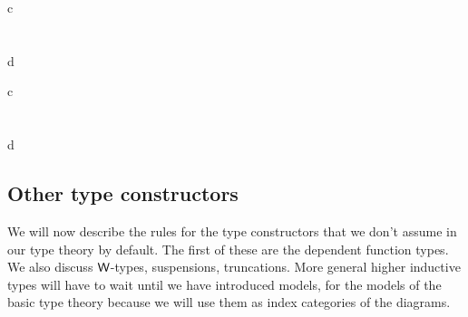 \begin{infarray}{c}
\inference{\jctx{\Gamma}}{\jtype{\ctxext{\Gamma}{\ctxwk{\Gamma}{\Gamma}}}{\idtypevar{\Gamma}}}\\
\\
           {}\\
{\jtermteq
  {\ctxext{{\Gamma}{\ctxwk{\Gamma}{\Gamma}}}{\idtypevar{\Gamma}}}
  {}
  {}
  {d}}
\end{infarray}

\begin{infarray}{c}
\\
\\
{}\\
{\jtermteq
  {}
  {}
  {}
  {d}}
\end{infarray}

\subsection{Other type constructors}
We will now describe the rules for the type constructors that we don't assume
in our type theory by default. The first of these are the dependent function
types. We also discuss $\mathsf{W}$-types, suspensions, truncations. More general higher inductive
types will have to wait until we have introduced models, for the models of the
basic type theory because we will use them as index categories of the diagrams.


